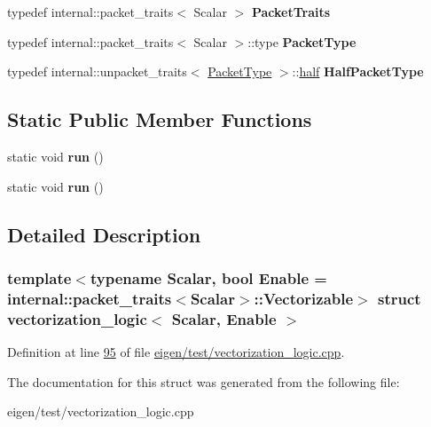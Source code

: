 \begin{DoxyCompactItemize}
typedef internal\+::packet\+\_\+traits$<$ Scalar $>$ {\bfseries Packet\+Traits}
\item 
\mbox{\label{structvectorization__logic_a01f668e8607439c864cf203c5fc13fbb}} 
typedef internal\+::packet\+\_\+traits$<$ Scalar $>$\+::type {\bfseries Packet\+Type}
\item 
\mbox{\label{structvectorization__logic_a29280e414cd26c38ce92dc364610fbb7}} 
typedef internal\+::unpacket\+\_\+traits$<$ \hyperlink{group___sparse_core___module}{Packet\+Type} $>$\+::\hyperlink{struct_eigen_1_1half}{half} {\bfseries Half\+Packet\+Type}
\end{DoxyCompactItemize}
\subsection*{Static Public Member Functions}
\begin{DoxyCompactItemize}
\item 
\mbox{\label{structvectorization__logic_a565180db0ec40b5e47bdba058407f41c}} 
static void {\bfseries run} ()
\item 
\mbox{\label{structvectorization__logic_a565180db0ec40b5e47bdba058407f41c}} 
static void {\bfseries run} ()
\end{DoxyCompactItemize}


\subsection{Detailed Description}
\subsubsection*{template$<$typename Scalar, bool Enable = internal\+::packet\+\_\+traits$<$\+Scalar$>$\+::\+Vectorizable$>$\newline
struct vectorization\+\_\+logic$<$ Scalar, Enable $>$}



Definition at line \hyperlink{eigen_2test_2vectorization__logic_8cpp_source_l00095}{95} of file \hyperlink{eigen_2test_2vectorization__logic_8cpp_source}{eigen/test/vectorization\+\_\+logic.\+cpp}.



The documentation for this struct was generated from the following file\+:\begin{DoxyCompactItemize}
\item 
eigen/test/vectorization\+\_\+logic.\+cpp\end{DoxyCompactItemize}
